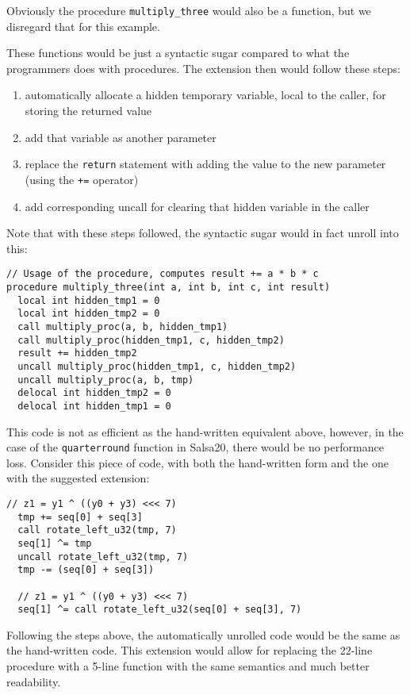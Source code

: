 \documentclass[a4paper,10pt,openright]{memoir}
\newcommand{\code}[1]{\texttt{#1}}
\begin{document}
Obviously the procedure \code{multiply\_three} would also be a function, 
but we disregard that for this example.

These functions would be just a syntactic sugar compared to what the 
programmers does with procedures. The extension then would follow these 
steps:

\begin{enumerate}
\item automatically allocate a hidden temporary variable, local to the caller, for storing the returned value
\item add that variable as another parameter
\item replace the \code{return} statement with adding the value to the new parameter (using the \code{+=} operator)
\item add corresponding uncall for clearing that hidden variable in the caller
\end{enumerate}

Note that with these steps followed, the syntactic sugar would in fact 
unroll into this:

\begin{lstlisting}[language=Janus]
// Usage of the procedure, computes result += a * b * c
procedure multiply_three(int a, int b, int c, int result)
  local int hidden_tmp1 = 0
  local int hidden_tmp2 = 0
  call multiply_proc(a, b, hidden_tmp1)
  call multiply_proc(hidden_tmp1, c, hidden_tmp2)
  result += hidden_tmp2
  uncall multiply_proc(hidden_tmp1, c, hidden_tmp2)
  uncall multiply_proc(a, b, tmp)
  delocal int hidden_tmp2 = 0
  delocal int hidden_tmp1 = 0
\end{lstlisting}

This code is not as efficient as the hand-written equivalent above, 
however, in the case of the \code{quarterround} function in Salsa20, 
there would be no performance loss. Consider this piece of code, 
with both the hand-written form and the one with the suggested 
extension:

\begin{lstlisting}[language=Janus]
  // z1 = y1 ^ ((y0 + y3) <<< 7)
  tmp += seq[0] + seq[3]
  call rotate_left_u32(tmp, 7)
  seq[1] ^= tmp
  uncall rotate_left_u32(tmp, 7)
  tmp -= (seq[0] + seq[3])
  
  // z1 = y1 ^ ((y0 + y3) <<< 7)
  seq[1] ^= call rotate_left_u32(seq[0] + seq[3], 7)
\end{lstlisting}

Following the steps above, the automatically unrolled code would be the 
same as the hand-written code. This extension would allow for replacing 
the 22-line procedure with a 5-line function with the same semantics 
and much better readability.
\end{document}
